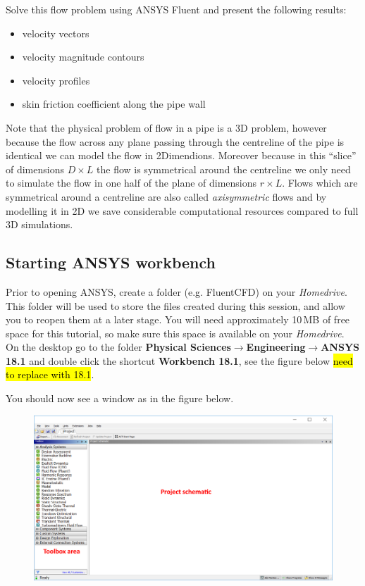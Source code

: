 \documentclass[11pt,a4paper,oneside,hidelinks]{scrartcl}
\newcommand\bfr[1]{\textcolor[rgb]{1,0.00,0.00}{\textbf{\textsf{#1}}}}
\newcommand\ra{$\rightarrow$}
\begin{document}
Solve this flow problem using ANSYS Fluent and present the following results:
\begin{itemize}
\item velocity vectors
\item velocity magnitude contours
\item velocity profiles
\item skin friction coefficient along the pipe wall
\end{itemize}

Note that the physical problem of flow in a pipe is a 3D problem, however because the flow across any plane passing through the centreline of the pipe is identical we can model the flow in 2Dimendions. Moreover because in this ``slice'' of dimensions $D\times L$ the flow is symmetrical around the centreline we only need to simulate the flow in one half of the plane of dimensions $r\times L$. Flows which are symmetrical around a centreline are also called \emph{axisymmetric} flows and by modelling it in 2D we save considerable computational resources compared to full 3D simulations.


\subsection{Starting ANSYS workbench}

Prior to opening ANSYS, create a folder (e.g. FluentCFD) on your \emph{Homedrive}. This folder will be used to store the files created during this session, and allow you to reopen them at a later stage. You will need approximately 10\,MB of free space for this tutorial, so make sure this space is available on your \emph{Homedrive}.\\

On the desktop go to the folder \bfr{Physical Sciences\ra Engineering\ra ANSYS 18.1} and double click the shortcut \bfr{Workbench 18.1}, see the figure below \hl{need to replace with 18.1}.


You should now see a window as in the figure below.

\begin{figure}[H]
\begin{center}
\includegraphics[width=.7\textwidth,clip]{workbench.png}
\end{center}
\end{figure}
\end{document}
